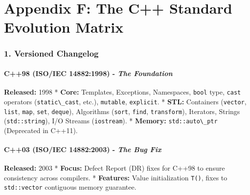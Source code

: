 \hypertarget{appendix-f-the-c-standard-evolution-matrix}{%
\section{Appendix F: The C++ Standard Evolution
Matrix}\label{appendix-f-the-c-standard-evolution-matrix}}

\hypertarget{versioned-changelog}{%
\subsubsection{1. Versioned Changelog}\label{versioned-changelog}}

\hypertarget{c98-isoiec-148821998---the-foundation}{%
\paragraph{\texorpdfstring{\textbf{C++98 (ISO/IEC 14882:1998)} -
\emph{The
Foundation}}{C++98 (ISO/IEC 14882:1998) - The Foundation}}\label{c98-isoiec-148821998---the-foundation}}

\textbf{Released:} 1998 * \textbf{Core:} Templates, Exceptions,
Namespaces, \passthrough{\lstinline!bool!} type,
\passthrough{\lstinline!cast!} operators
(\passthrough{\lstinline!static\_cast!}, etc.),
\passthrough{\lstinline!mutable!}, \passthrough{\lstinline!explicit!}. *
\textbf{STL:} Containers (\passthrough{\lstinline!vector!},
\passthrough{\lstinline!list!}, \passthrough{\lstinline!map!},
\passthrough{\lstinline!set!}, \passthrough{\lstinline!deque!}),
Algorithms (\passthrough{\lstinline!sort!},
\passthrough{\lstinline!find!}, \passthrough{\lstinline!transform!}),
Iterators, Strings (\passthrough{\lstinline!std::string!}), I/O Streams
(\passthrough{\lstinline!iostream!}). * \textbf{Memory:}
\passthrough{\lstinline!std::auto\_ptr!} (Deprecated in C++11).

\hypertarget{c03-isoiec-148822003---the-bug-fix}{%
\paragraph{\texorpdfstring{\textbf{C++03 (ISO/IEC 14882:2003)} -
\emph{The Bug
Fix}}{C++03 (ISO/IEC 14882:2003) - The Bug Fix}}\label{c03-isoiec-148822003---the-bug-fix}}

\textbf{Released:} 2003 * \textbf{Focus:} Defect Report (DR) fixes for
C++98 to ensure consistency across compilers. * \textbf{Features:} Value
initialization \passthrough{\lstinline!T()!}, fixes to
\passthrough{\lstinline!std::vector!} contiguous memory guarantee.

